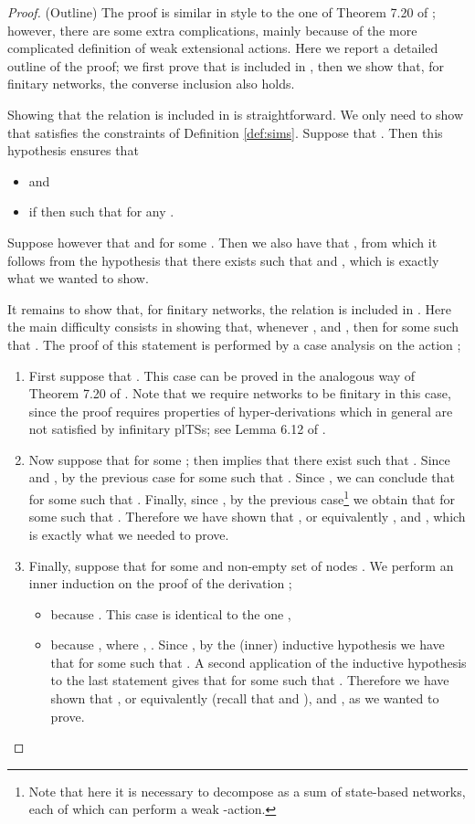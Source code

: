 \documentclass{LMCS}
\begin{document}
\begin{proof}(Outline)
The proof is similar in style to the one of Theorem 7.20 of \cite{DGHM09full}; however, there are some extra complications, mainly because of the more complicated definition of weak extensional actions. 
Here we report a detailed outline of the proof; we first prove that 
 is included in , then we show that, for finitary networks, 
the converse inclusion also holds.

Showing that the relation  is included in  is straightforward. 
We only need to show that  satisfies the constraints of Definition \ref{def:sims}.
Suppose that . Then this hypothesis ensures that 
\begin{itemize}
\item 
 and 
\item if  then  such that 
 for any .
\end{itemize}
Suppose however that  and  
for some . Then we also have that , from which 
it follows from the hypothesis  that there exists  
such that  and , which is exactly 
what we wanted to show.

It remains to show that, for finitary networks, the relation  is included in . 
Here the main difficulty consists in showing that, whenever , 
 and , then  
for some  such that . 
The proof of this statement is performed by a case analysis on the action ;

\begin{enumerate}
\item First suppose that .
This case can be proved in the analogous way of 
Theorem 7.20 of \cite{DGHM09full}. Note that we require networks to be finitary in this 
case, since the proof requires properties of hyper-derivations 
which in general are not satisfied by infinitary plTSs; see Lemma 6.12 of \cite{DGHM09full}.

\item Now suppose that  for some ; then  
implies that there exist  such that . 
Since  and , by the previous case  
for some  such that . Since , we can 
conclude that  for some  such that 
. Finally, since , 
by the previous case\footnote{Note that here it is necessary to decompose  as a sum 
of state-based networks, each of which can perform a weak -action.} we obtain that  for some 
 such that . 
Therefore we have shown that , 
or equivalently , and , which 
is exactly what we needed to prove.

\item Finally, suppose that  for some  and non-empty set of 
nodes . We perform an inner induction on the proof of the derivation ;
\begin{itemize}
\item  because . 
This case is identical to the one ,
\item  because , 
where , 
. Since , by the (inner) inductive hypothesis we have that 
 for some  such that . 
A second application of the inductive hypothesis to the last statement gives that  
for some  such that . Therefore we have shown that 
, or equivalently 
 (recall that  and ), 
and , as we wanted to prove.\qedhere
\end{itemize} 
\end{enumerate}
\end{proof}\smallskip
\end{document}
